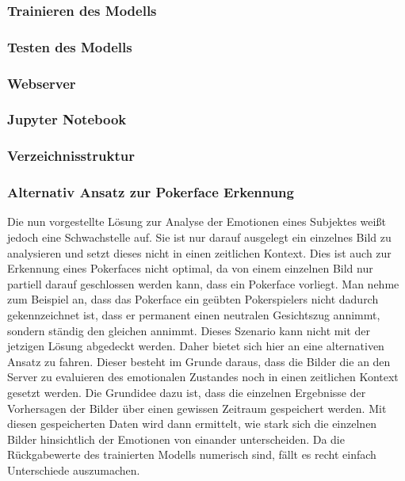 \documentclass[12pt, a4paper]{scrbook}
\begin{document}
\subsubsection{Trainieren des Modells}

\subsubsection{Testen des Modells}

\subsubsection{Webserver}

\subsubsection{Jupyter Notebook}

\subsubsection{Verzeichnisstruktur}

\subsubsection{Alternativ Ansatz zur Pokerface Erkennung}
Die nun vorgestellte Lösung zur Analyse der Emotionen eines Subjektes weißt jedoch eine Schwachstelle auf. Sie ist nur darauf ausgelegt ein einzelnes Bild zu analysieren und setzt dieses nicht in einen zeitlichen Kontext. Dies ist auch zur Erkennung eines Pokerfaces nicht optimal, da von einem einzelnen Bild nur partiell darauf geschlossen werden kann, dass ein Pokerface vorliegt. Man nehme zum Beispiel an, dass das Pokerface ein geübten Pokerspielers nicht dadurch gekennzeichnet ist, dass er permanent einen neutralen Gesichtszug annimmt, sondern ständig den gleichen annimmt. Dieses Szenario kann nicht mit der jetzigen Lösung abgedeckt werden. Daher bietet sich hier an eine alternativen Ansatz zu fahren. Dieser besteht im Grunde daraus, dass die Bilder die an den Server zu evaluieren des emotionalen Zustandes noch in einen zeitlichen Kontext gesetzt werden. Die Grundidee dazu ist, dass die einzelnen Ergebnisse der Vorhersagen der Bilder über einen gewissen Zeitraum gespeichert werden. Mit diesen gespeicherten Daten wird dann ermittelt, wie stark sich die einzelnen Bilder hinsichtlich der Emotionen von einander unterscheiden. Da die Rückgabewerte des trainierten Modells numerisch sind, fällt es recht einfach Unterschiede auszumachen. 
\end{document}
